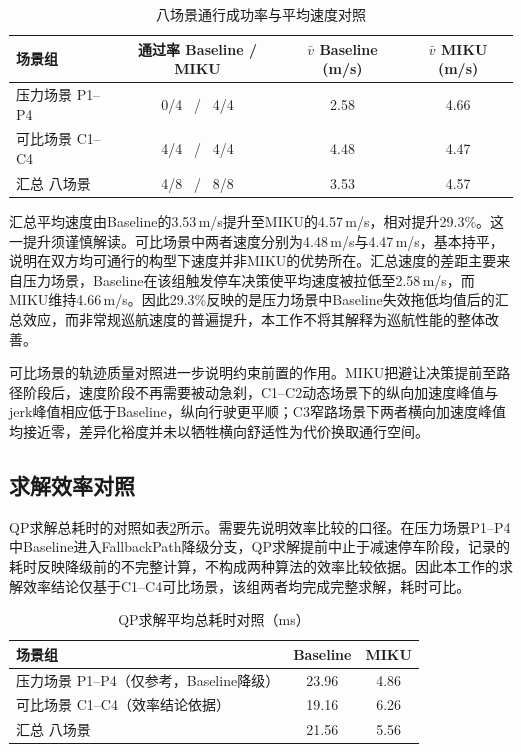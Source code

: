 \documentclass[a4paper,11pt]{ctexart}
\theoremstyle{definition}
\begin{document}
\begin{table}[htbp]
\centering
\caption{八场景通行成功率与平均速度对照}
\label{tab:exp_pass}
\small
\begin{tabular}{lccc}
\toprule
\textbf{场景组} & \textbf{通过率 Baseline / MIKU} & \textbf{$\bar v$ Baseline (m/s)} & \textbf{$\bar v$ MIKU (m/s)} \\
\midrule
压力场景 P1--P4 & 0/4 \ / \ 4/4 & 2.58 & 4.66 \\
可比场景 C1--C4 & 4/4 \ / \ 4/4 & 4.48 & 4.47 \\
\midrule
汇总 八场景 & 4/8 \ / \ 8/8 & 3.53 & 4.57 \\
\bottomrule
\end{tabular}
\end{table}

汇总平均速度由Baseline的3.53\,m/s提升至MIKU的4.57\,m/s，相对提升29.3\%。这一提升须谨慎解读。可比场景中两者速度分别为4.48\,m/s与4.47\,m/s，基本持平，说明在双方均可通行的构型下速度并非MIKU的优势所在。汇总速度的差距主要来自压力场景，Baseline在该组触发停车决策使平均速度被拉低至2.58\,m/s，而MIKU维持4.66\,m/s。因此29.3\%反映的是压力场景中Baseline失效拖低均值后的汇总效应，而非常规巡航速度的普遍提升，本工作不将其解释为巡航性能的整体改善。

可比场景的轨迹质量对照进一步说明约束前置的作用。MIKU把避让决策提前至路径阶段后，速度阶段不再需要被动急刹，C1--C2动态场景下的纵向加速度峰值与jerk峰值相应低于Baseline，纵向行驶更平顺；C3窄路场景下两者横向加速度峰值均接近零，差异化裕度并未以牺牲横向舒适性为代价换取通行空间。

\subsection{求解效率对照}
\label{subsec:exp_qp}

QP求解总耗时的对照如表\ref{tab:exp_qp}所示。需要先说明效率比较的口径。在压力场景P1--P4中Baseline进入FallbackPath降级分支，QP求解提前中止于减速停车阶段，记录的耗时反映降级前的不完整计算，不构成两种算法的效率比较依据。因此本工作的求解效率结论仅基于C1--C4可比场景，该组两者均完成完整求解，耗时可比。

\begin{table}[htbp]
\centering
\caption{QP求解平均总耗时对照（ms）}
\label{tab:exp_qp}
\small
\begin{tabular}{lcc}
\toprule
\textbf{场景组} & \textbf{Baseline} & \textbf{MIKU} \\
\midrule
压力场景 P1--P4（仅参考，Baseline降级） & 23.96 & 4.86 \\
可比场景 C1--C4（效率结论依据） & 19.16 & 6.26 \\
\midrule
汇总 八场景 & 21.56 & 5.56 \\
\bottomrule
\end{tabular}
\end{table}
\end{document}
